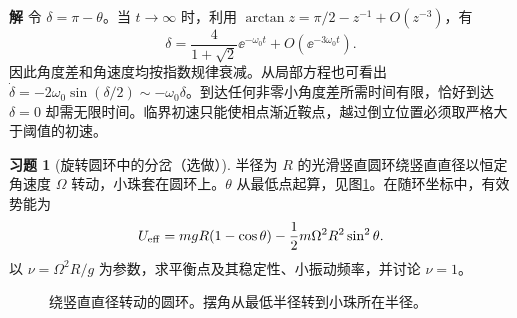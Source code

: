 \documentclass[11pt,openany,fontset=fandol]{ctexbook}
\theoremstyle{definition}\newtheorem{example}{例}[chapter]\newtheorem{exercise}{习题}[chapter]
\newcommand{\SolutionStart}{\par\medskip\ifdim\pagetotal>0pt\ifdim\dimexpr\pagegoal-\pagetotal\relax<3\baselineskip\newpage\fi\fi\noindent\textbf{解}\quad\ignorespaces}
\newenvironment{solution}{\SolutionStart}{\par\medskip}
\begin{document}
\begin{solution}
令 $\delta=\pi-\theta$。当 $t\to\infty$ 时，利用 $\arctan z=\pi/2-z^{-1}+O(z^{-3})$，有
\[
\delta=\frac4{1+\sqrt2}\ee^{-\omega_0t}
+O(\ee^{-3\omega_0t}).
\]
因此角度差和角速度均按指数规律衰减。从局部方程也可看出 $\dot\delta=-2\omega_0\sin(\delta/2)\sim-\omega_0\delta$。到达任何非零小角度差所需时间有限，恰好到达 $\delta=0$ 却需无限时间。临界初速只能使相点渐近鞍点，越过倒立位置必须取严格大于阈值的初速。
\end{solution}

\par\medskip\noindent\begin{minipage}{\textwidth}
\begin{exercise}[旋转圆环中的分岔（选做）]\label{mp4:exercise:l4-h8}
半径为 $R$ 的光滑竖直圆环绕竖直直径以恒定角速度 $\Omega$ 转动，小珠套在圆环上。$\theta$ 从最低点起算，见图\ref{mp4:fig:l4-h8-q}。在随环坐标中，有效势能为
\[
U_{\rm eff}=mgR(1-\cos\theta)-\frac12m\Omega^2R^2\sin^2\theta.
\]
以 $\nu=\Omega^2R/g$ 为参数，求平衡点及其稳定性、小振动频率，并讨论 $\nu=1$。
\end{exercise}

\begin{figure}[H]\centering
{}
\caption{绕竖直直径转动的圆环。摆角从最低半径转到小珠所在半径。}\label{mp4:fig:l4-h8-q}
\end{figure}
\end{minipage}\par\medskip
\end{document}
